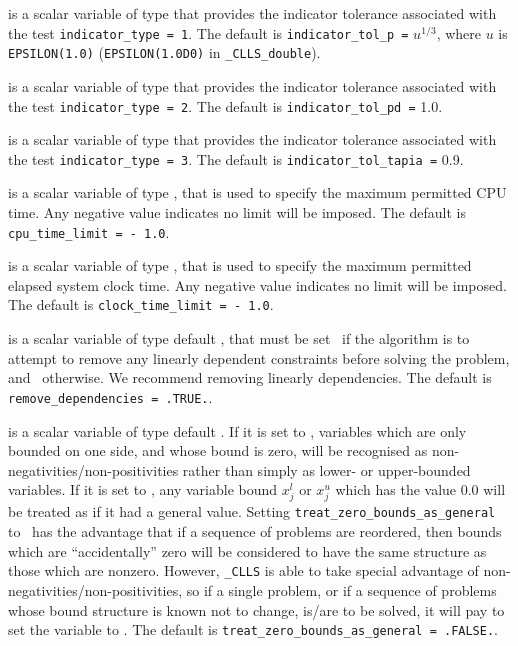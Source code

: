 \documentclass{galahad}
\newcommand{\packagename}{CLLS}
\newcommand{\fullpackagename}{\libraryname\_\packagename}
\begin{document}
\begin{description}
is a scalar variable of type \realdp that
provides the indicator tolerance associated with the test
{\tt indicator\_type = 1}.
The default is {\tt indicator\_tol\_p =} $u^{1/3}$,
where $u$ is {\tt EPSILON(1.0)} ({\tt EPSILON(1.0D0)} in
{\tt \fullpackagename\_double}).

is a scalar variable of type \realdp that
provides the indicator tolerance associated with the test
{\tt indicator\_type = 2}.
The default is {\tt indicator\_tol\_pd =} 1.0.

is a scalar variable of type \realdp that
provides the indicator tolerance associated with the test
{\tt indicator\_type = 3}.
The default is {\tt indicator\_tol\-\_tapia =} 0.9.

 is a scalar variable of type \realdp,
that is used to specify the maximum permitted CPU time. Any negative
value indicates no limit will be imposed. The default is
{\tt cpu\_time\_limit = - 1.0}.

 is a scalar variable of type \realdp,
that is used to specify the maximum permitted elapsed system clock time.
Any negative value indicates no limit will be imposed. The default is
{\tt clock\_time\_limit = - 1.0}.

 is a scalar variable of type
default \logical, that must be set \true\ if the algorithm
is to attempt to remove any linearly dependent constraints before
solving the problem, and \false\ otherwise.
We recommend removing linearly dependencies.
The default is {\tt remove\_dependencies = .TRUE.}.

 is a scalar variable of type
default \logical.
If it is set to \false, variables which
are only bounded on one side, and whose bound is zero,
will be recognised as non-negativities/non-positivities rather than simply as
lower- or upper-bounded variables.
If it is set to \true, any variable bound
$x_{j}^{l}$ or $x_{j}^{u}$ which has the value 0.0 will be
treated as if it had a general value.
Setting {\tt treat\_zero\_bounds\_as\_general} to \true\ has the advantage
that if a sequence of problems are reordered, then bounds which are
``accidentally'' zero will be considered to have the same structure as
those which are nonzero. However, {\tt \fullpackagename} is
able to take special advantage of non-negativities/non-positivities, so
if a single problem, or if a sequence of problems whose
bound structure is known not to change, is/are to be solved,
it will pay to set the variable to \false.
The default is {\tt treat\_zero\_bounds\_as\_general = .FALSE.}.


\end{description}
\end{document}
